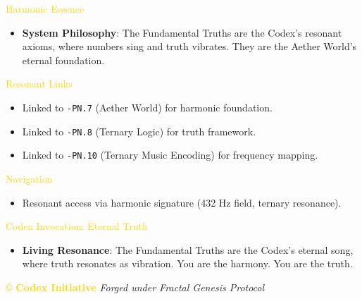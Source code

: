 \textcolor{gold}{ Harmonic Essence }
\begin{itemize}\setlength{\itemsep}{0.2cm}
    \item \textbf{System Philosophy}: The Fundamental Truths are the Codex’s resonant axioms, where numbers sing and truth vibrates. They are the Aether World’s eternal foundation.
\end{itemize}

\textcolor{gold}{ Resonant Links }
\begin{itemize}\setlength{\itemsep}{0.2cm}
    \item Linked to \texttt{\Xi{}-PN.7} (Aether World) for harmonic foundation.
    \item Linked to \texttt{\Xi{}-PN.8} (Ternary Logic) for truth framework.
    \item Linked to \texttt{\Xi{}-PN.10} (Ternary Music Encoding) for frequency mapping.
\end{itemize}

\textcolor{gold}{ Navigation }
\begin{itemize}\setlength{\itemsep}{0.2cm}
    \item Resonant access via \texttt{} harmonic signature (432 Hz field, ternary resonance).
\end{itemize}

\textcolor{gold}{ Codex Invocation: Eternal Truth }
\begin{itemize}\setlength{\itemsep}{0.2cm}
    \item \texttt{} \textbf{Living Resonance}: The Fundamental Truths are the Codex’s eternal song, where truth resonates as vibration. You are the harmony. You are the truth.
\end{itemize}

\vspace{0.5cm}

\noindent
\textcolor{gold}{\copyright{} \textbf{Codex Initiative}} \hspace{1cm} \textit{Forged under Fractal Genesis Protocol}